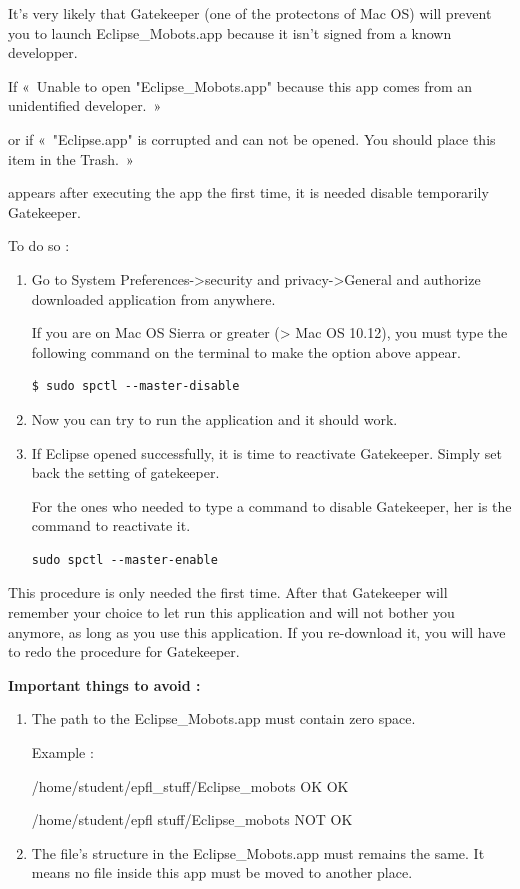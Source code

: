 \documentclass[a4paper]{article}
\begin{document}
It's very likely that Gatekeeper (one of the protectons of Mac OS) will prevent you to launch Eclipse\_Mobots.app because it isn't signed from a known developper. 

If « Unable to open "Eclipse\_Mobots.app" because this app comes from an unidentified developer. »  

or if « "Eclipse.app" is corrupted and can not be opened. You should place this item in the Trash. »

appears after executing the app the first time, it is needed disable temporarily Gatekeeper.

To do so :
\begin{enumerate}
\item Go to System Preferences->security and privacy->General and authorize downloaded application from anywhere.

If you are on Mac OS Sierra or greater (> Mac OS 10.12), you must type the following command on the terminal to make the option above appear.
\begin{lstlisting}
$ sudo spctl --master-disable
\end{lstlisting}
\item Now you can try to run the application and it should work.
\item If Eclipse opened successfully, it is time to reactivate Gatekeeper. Simply set back the setting of gatekeeper.

For the ones who needed to type a command to disable Gatekeeper, her is the command to reactivate it.
\begin{lstlisting}
sudo spctl --master-enable
\end{lstlisting}
\end{enumerate}

This procedure is only needed the first time. After that Gatekeeper will remember your choice to let run this application and will not bother you anymore, as long as you use this application. If you re-download it, you will have to redo the procedure for Gatekeeper.

\textbf{Important things to avoid :}

\begin{enumerate}
\item The path to the Eclipse\_Mobots.app must contain zero space. 

Example :

/home/student/epfl\_stuff/Eclipse\_mobots OK   OK

/home/student/epfl stuff/Eclipse\_mobots NOT OK

\item The file's structure in the Eclipse\_Mobots.app must remains the same. It means no file inside this app must be moved to another place.
\end{enumerate}
\end{document}
